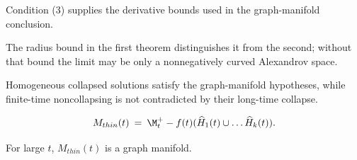 \begin{remark}
\label{rem:kl-thin-part-graph-manifold-structural-remark-thick-thin-geometry}

Condition (3) supplies the derivative bounds used in the graph-manifold conclusion.
\end{remark}

\begin{remark}
\label{rem:kl-thin-part-graph-manifold-positivity-thick-thin-geometry}

The radius bound in the first theorem distinguishes it from the second; without that bound the limit may be only a nonnegatively curved Alexandrov space.
\end{remark}

\begin{remark}
\label{rem:kl-thin-part-graph-manifold-existence-thick-thin-geometry}

Homogeneous collapsed solutions satisfy the graph-manifold hypotheses, while finite-time noncollapsing is not contradicted by their long-time collapse.
\end{remark}

\begin{equation}
M_{thin}(t) \: = \: \M_t^+ - f(t) (\widehat{H}_1(t) \cup \ldots \widehat{H}_k(t)).
\end{equation}

\begin{proposition}
  \label{prop:kl-thin-part-graph-manifold-thick-thin-geometry-proposition}
 \label{thingraph}
For large $t$, $M_{thin}(t)$ is a graph manifold.
\end{proposition}

